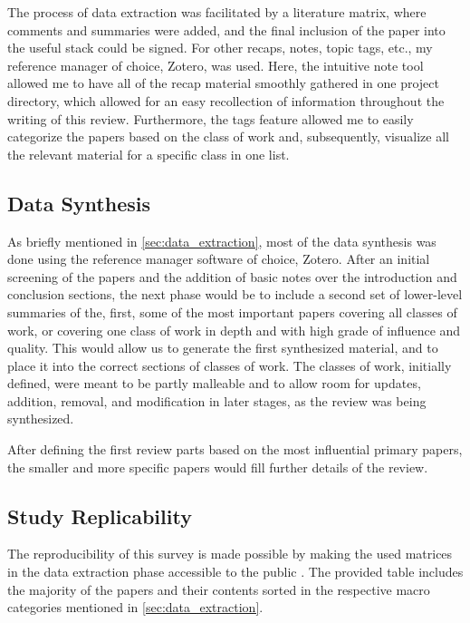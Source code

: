     The process of data extraction was facilitated by a literature matrix, where comments and summaries were added, and the final inclusion of the paper into the useful stack could be signed. For other recaps, notes, topic tags, etc., my reference manager of choice, Zotero, was used. Here, the intuitive note tool allowed me to have all of the recap material smoothly gathered in one project directory, which allowed for an easy recollection of information throughout the writing of this review. Furthermore, the tags feature allowed me to easily categorize the papers based on the class of work and, subsequently, visualize all the relevant material for a specific class in one list.





\subsection{Data Synthesis}
\label{sec:data_synth}
    As briefly mentioned in \autoref{sec:data_extraction}, most of the data synthesis was done using the reference manager software of choice, Zotero. After an initial screening of the papers and the addition of basic notes over the introduction and conclusion sections, the next phase would be to include a second set of lower-level summaries of the, first, some of the most important papers covering all classes of work, or covering one class of work in depth and with high grade of influence and quality. This would allow us to generate the first synthesized material, and to place it into the correct sections of classes of work. The classes of work, initially defined, were meant to be partly malleable and to allow room for updates, addition, removal, and modification in later stages, as the review was being synthesized.

    After defining the first review parts based on the most influential primary papers, the smaller and more specific papers would fill further details of the review.


\subsection{Study Replicability}
\label{sec:replicability}


    The reproducibility of this survey is made possible by making the used matrices in the data extraction phase accessible to the public \cite{literature-matrix}. The provided table includes the majority of the papers and their contents sorted in the respective macro categories mentioned in \autoref{sec:data_extraction}.
